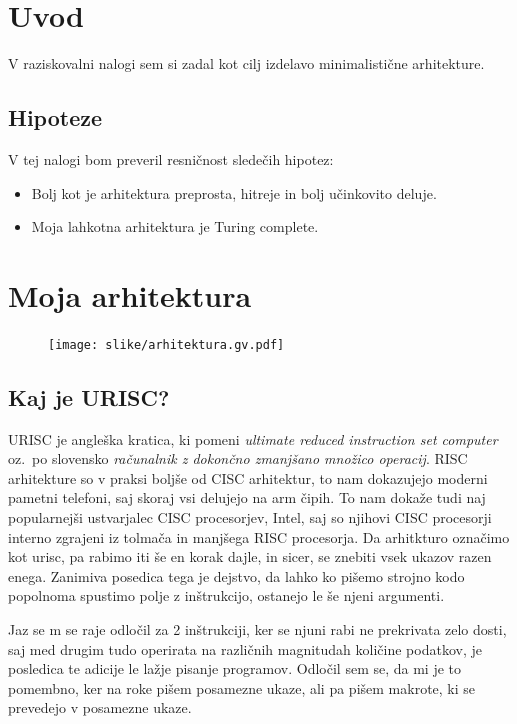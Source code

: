 \documentclass[12pt]{article}
\begin{document}

\section{Uvod}
V raziskovalni nalogi sem si zadal kot cilj izdelavo minimalistične arhitekture.

\subsection{Hipoteze}
V tej nalogi bom preveril resničnost sledečih hipotez:
\begin{itemize}
  \item Bolj kot je arhitektura preprosta, hitreje in bolj učinkovito deluje.
  \item Moja lahkotna arhitektura je Turing complete.
\end{itemize}

\section{Moja arhitektura}
\begin{figure}[h]
  \centering
  \texttt{[image: slike/arhitektura.gv.pdf]}
  \end{figure}

\subsection{Kaj je URISC?}
URISC je angleška kratica, ki pomeni \textit{ultimate reduced instruction set computer} oz.\ po slovensko \textit{računalnik z dokončno zmanjšano množico operacij}.
RISC arhitekture so v praksi boljše od CISC arhitektur, to nam dokazujejo moderni pametni telefoni, saj skoraj vsi delujejo na arm čipih.
To nam dokaže tudi naj popularnejši ustvarjalec CISC procesorjev, Intel, saj so njihovi CISC procesorji interno zgrajeni iz tolmača in manjšega RISC procesorja.
Da arhitkturo označimo kot urisc, pa rabimo iti še en korak dajle, in sicer, se znebiti vsek ukazov razen enega.
Zanimiva posedica tega je dejstvo, da lahko ko pišemo strojno kodo popolnoma spustimo polje z inštrukcijo, ostanejo le še njeni argumenti.

Jaz se m se raje odločil za 2 inštrukciji, ker se njuni rabi ne prekrivata zelo dosti, saj med drugim tudo operirata na različnih magnitudah količine podatkov, je posledica te adicije le lažje pisanje programov.
Odločil sem se, da mi je to pomembno, ker na roke pišem posamezne ukaze, ali pa pišem makrote, ki se prevedejo v posamezne ukaze.
\end{document}
